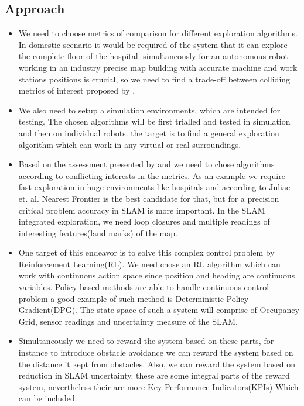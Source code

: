 \subsection{Approach}
\begin{itemize}

\item We need to choose metrics of comparison for different exploration algorithms. In domestic
scenario it would be required of the system that it can explore the complete floor of the hospital.
simultaneously for an autonomous robot working in an industry precise map building with accurate
machine and work stations positions is crucial, so we need to find a trade-off between colliding
metrics of interest proposed by \cite{Yan2015}.

\item We also need to setup a simulation environments, which are intended for testing. The chosen
algorithms will be first trialled and tested in simulation and then on individual robots. the target
is to find a general exploration algorithm which can work in any virtual or real surroundings.

\item Based on the assessment presented by \cite{Juliae2012} and \cite{Yan2015} we need to chose
algorithms according to conflicting interests in the metrics. As an example we require fast
exploration in huge environments like hospitals and according to Juliae et. al. Nearest Frontier is
the best candidate for that, but for a precision critical problem accuracy in SLAM is more
important. In the SLAM integrated exploration, we need loop closures and multiple readings of
interesting features(land marks) of the map.

 \item One target of this endeavor is to solve this complex control problem by Reinforcement
Learning(RL). We need chose an RL algorithm which can work with continuous action space since
position and heading are continuous variables. Policy based methods are able to handle continuous
control problem a good example of such method is Deterministic Policy Gradient(DPG). The state space
of such a system will comprise of Occupancy Grid, sensor readings and uncertainty measure of the
SLAM.
\item Simultaneously we need to reward the system based on these parts, for instance to introduce
obstacle avoidance we can reward the system based on the distance it kept from obstacles. Also, we
can reward the system based on reduction in SLAM uncertainty. these are some integral parts of the
reward system, nevertheless their are more Key Performance Indicators(KPIs) Which can be included.


\end{itemize}

